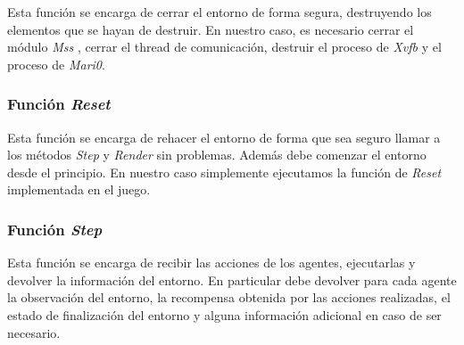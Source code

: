Esta función se encarga de cerrar el entorno de forma segura, destruyendo los elementos que se hayan de destruir. En nuestro caso, es necesario cerrar el módulo \textit{Mss} \cite {mss}, cerrar el thread de comunicación, destruir el proceso de \textit{Xvfb} \cite {xvfb} y el proceso de \textit{Mari0}.

\subsubsection*{Función \textit{Reset}}

Esta función se encarga de rehacer el entorno de forma que sea seguro llamar a los métodos \textit{Step} y \textit{Render} sin problemas. Además debe comenzar el entorno desde el principio. En nuestro caso simplemente ejecutamos la función de \textit{Reset} implementada en el juego.

\subsubsection*{Función \textit{Step}}

Esta función se encarga de recibir las acciones de los agentes, ejecutarlas y devolver la información del entorno. En particular debe devolver para cada agente la observación del entorno, la recompensa obtenida por las acciones realizadas, el estado de finalización del entorno y alguna información adicional en caso de ser necesario.
